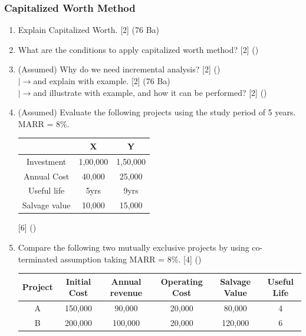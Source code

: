 \documentclass[12pt]{article}
\newcommand{\lb}{\\ $\left|\rightarrow\right.$}
\begin{document}
	\subsubsection{Capitalized Worth Method}
	\begin{enumerate}[noitemsep, topsep=0pt]
		\item Explain Capitalized Worth. \hfill [2] (76 Ba)		
		
		\item What are the conditions to apply capitalized worth method? \hfill [2] ()
		
		\item (Assumed) Why do we need incremental analysis? \hfill [2] ()
		\lb and explain with example. \hfill [2] (76 Ba)
		\lb and illustrate with example, and how it can be performed? \hfill [2] ()

		\item (Assumed) Evaluate the following projects using the study period of 5 years. MARR = 8\%.\\
		\begin{tabular}{|c|c|c|}
			\hline
			& X & Y \\ \hline
			Investment & 1,00,000 & 1,50,000 \\ \hline
			Annual Cost & 40,000 & 25,000 \\ \hline
			Useful life & 5yrs & 9yrs \\ \hline
			Salvage value & 10,000 & 15,000 \\ \hline
		\end{tabular} \hfill [6] ()
		
		\item Compare the following two mutually exclusive projects by using co-terminated assumption taking MARR = 8\%. \hfill [4] () \\
		\begin{tabular}{|c|c|c|c|c|c|}
			\hline
			Project & Initial Cost & Annual revenue & Operating Cost & Salvage Value & Useful Life \\ \hline
			A & 150,000 & 90,000 & 20,000 & 80,000 & 4 \\ \hline
			B & 200,000 & 100,000 & 20,000 & 120,000 & 6 \\ \hline
		\end{tabular}
	\end{enumerate}
	
\end{document}
